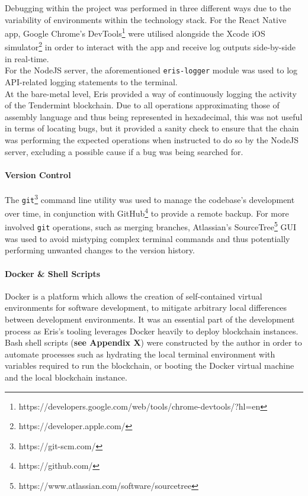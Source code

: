 \documentclass[12pt]{report}
\let\oldparagraph\paragraph
\renewcommand{\paragraph}[1]{\oldparagraph{#1}\mbox{}}
\begin{document}
Debugging within the project was performed in three different ways due
to the variability of environments within the technology stack. For the
React Native app, Google Chrome's
DevTools\footnote{https://developers.google.com/web/tools/chrome-devtools/?hl=en}
were utilised alongside the Xcode iOS
simulator\footnote{https://developer.apple.com/} in order to interact with the app and receive log outputs
side-by-side in real-time.\\
For the NodeJS server, the aforementioned \texttt{eris-logger} module
was used to log API-related logging statements to the terminal.\\
At the bare-metal level, Eris provided a way of continuously logging the
activity of the Tendermint blockchain. Due to all operations
approximating those of assembly language and thus being represented in
hexadecimal, this was not useful in terms of locating bugs, but it
provided a sanity check to ensure that the chain was performing the
expected operations when instructed to do so by the NodeJS server,
excluding a possible cause if a bug was being searched for.

\paragraph{Version Control}\label{version-control}

The \texttt{git}\footnote{https://git-scm.com/} command line utility
was used to manage the codebase's development over time, in conjunction
with GitHub\footnote{https://github.com/} to provide a remote
backup. For more involved \texttt{git} operations, such as merging
branches, Atlassian's
SourceTree\footnote{https://www.atlassian.com/software/sourcetree}
GUI was used to avoid mistyping complex terminal commands and thus
potentially performing unwanted changes to the version history.

\paragraph{Docker \& Shell Scripts}\label{docker-shell-scripts}

Docker\cite{1docker} is a platform which
allows the creation of self-contained virtual environments for software
development, to mitigate arbitrary local differences between development
environments. It was an essential part of the development process as
Eris's tooling leverages Docker heavily to deploy blockchain
instances.\\
Bash shell scripts (\textbf{see Appendix X}) were constructed by the
author in order to automate processes such as hydrating the local
terminal environment with variables required to run the blockchain, or
booting the Docker virtual machine and the local blockchain instance.
\end{document}
